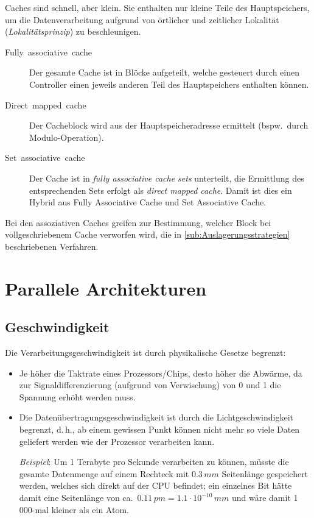 Caches sind schnell, aber klein.
Sie enthalten nur kleine Teile des Hauptspeichers, um die Datenverarbeitung aufgrund von örtlicher und zeitlicher Lokalität (\emph{Lokalitätsprinzip}) zu beschleunigen.
\begin{description}
  \item [{Fully~associative~cache}] 
	Der gesamte Cache ist in Blöcke aufgeteilt, welche gesteuert durch einen Controller einen jeweils anderen Teil des Hauptspeichers enthalten können.
  \item [{Direct~mapped~cache}] 
	Der Cacheblock wird aus der Hauptspeicheradresse ermittelt (bspw.~durch Modulo-Operation).
  \item [{Set~associative~cache}] 
	Der Cache ist in \emph{fully associative cache sets} unterteilt, die Ermittlung des entsprechenden Sets erfolgt als \emph{direct mapped cache}.
	Damit ist dies ein Hybrid aus Fully Associative Cache und Set Associative Cache.
\end{description}

Bei den assoziativen Caches greifen zur Bestimmung, welcher Block bei vollgeschriebenem Cache verworfen wird, die in \cref{sub:Auslagerungsstrategien} beschriebenen Verfahren.



\chapter{Parallele Architekturen}

\section{Geschwindigkeit}

Die Verarbeitungsgeschwindigkeit ist durch physikalische Gesetze begrenzt:
\begin{itemize}
  \item Je höher die Taktrate eines Prozessors/Chips, desto höher die Abwärme, da zur Signaldifferenzierung (aufgrund von Verwischung) von 0 und 1 die Spannung erhöht werden muss.
  \item Die Datenübertragungsgeschwindigkeit ist durch die Lichtgeschwindigkeit begrenzt, d.\,h., ab einem gewissen Punkt können nicht mehr so viele Daten geliefert werden wie der Prozessor verarbeiten kann.

	\emph{Beispiel}:
	Um 1 Terabyte pro Sekunde verarbeiten zu können, müsste die gesamte Datenmenge auf einem Rechteck mit $0.3\,\unit{mm}$ Seitenlänge gespeichert werden, welches sich direkt auf der CPU befindet; ein einzelnes Bit hätte damit eine Seitenlänge von ca.~$0.11\,\unit{pm} = 1.1\cdot10^{-10}\,\unit{mm}$ und wäre damit 1\,000-mal kleiner als ein Atom.
\end{itemize}

